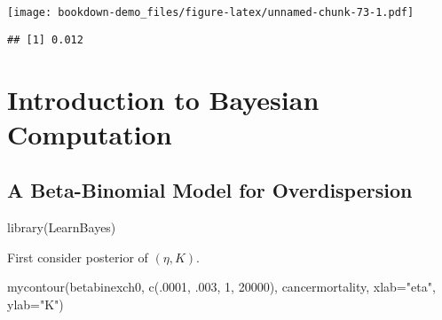 \documentclass[
]{book}
\newenvironment{Shaded}{\begin{snugshade}}{\end{snugshade}}
\newcommand{\AttributeTok}[1]{\textcolor[rgb]{0.77,0.63,0.00}{#1}}
\newcommand{\DecValTok}[1]{\textcolor[rgb]{0.00,0.00,0.81}{#1}}
\newcommand{\FunctionTok}[1]{\textcolor[rgb]{0.00,0.00,0.00}{#1}}
\newcommand{\NormalTok}[1]{#1}
\newcommand{\OtherTok}[1]{\textcolor[rgb]{0.56,0.35,0.01}{#1}}
\newcommand{\SpecialCharTok}[1]{\textcolor[rgb]{0.00,0.00,0.00}{#1}}
\newcommand{\StringTok}[1]{\textcolor[rgb]{0.31,0.60,0.02}{#1}}
\begin{document}
\texttt{[image: bookdown-demo\_files/figure-latex/unnamed-chunk-73-1.pdf]}

\begin{Shaded}
\end{Shaded}

\begin{verbatim}
## [1] 0.012
\end{verbatim}

\hypertarget{introduction-to-bayesian-computation}{%
\chapter{Introduction to Bayesian Computation}\label{introduction-to-bayesian-computation}}

\hypertarget{a-beta-binomial-model-for-overdispersion}{%
\section{A Beta-Binomial Model for Overdispersion}\label{a-beta-binomial-model-for-overdispersion}}

\begin{Shaded}
\begin{Highlighting}[]
\FunctionTok{library}\NormalTok{(LearnBayes)}
\end{Highlighting}
\end{Shaded}

First consider posterior of \((\eta, K)\).

\begin{Shaded}
\begin{Highlighting}[]
\FunctionTok{mycontour}\NormalTok{(betabinexch0,}
          \FunctionTok{c}\NormalTok{(.}\DecValTok{0001}\NormalTok{, .}\DecValTok{003}\NormalTok{, }\DecValTok{1}\NormalTok{, }\DecValTok{20000}\NormalTok{),}
\NormalTok{          cancermortality,}
          \AttributeTok{xlab=}\StringTok{"eta"}\NormalTok{, }\AttributeTok{ylab=}\StringTok{"K"}\NormalTok{)}
\end{Highlighting}
\end{Shaded}
\end{document}
